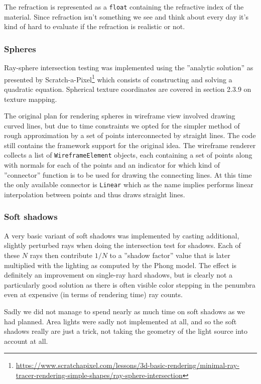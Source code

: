 \documentclass[a4paper,11pt]{article}
\begin{document}
The refraction is represented as a \texttt{float} containing the refractive index of the material.
Since refraction isn't something we see and think about every day it's kind of hard to evaluate if
the refraction is realistic or not.%

\subsubsection{Spheres}
Ray-sphere intersection testing was implemented using the ''analytic solution'' as presented
by Scratch-a-Pixel\footnote{\url{https://www.scratchapixel.com/lessons/3d-basic-rendering/minimal-ray-tracer-rendering-simple-shapes/ray-sphere-intersection}}
which consists of constructing and solving a quadratic equation. Spherical texture coordinates
are covered in section 2.3.9 on texture mapping.

The original plan for rendering spheres in wireframe view involved drawing curved lines, but
due to time constraints we opted for the simpler method of rough approximation by a set
of points interconnected by straight lines. The code still contains the framework support for
the original idea. The wireframe renderer collects a list of \texttt{WireframeElement} objects, each
containing a set of points along with normals for each of the points and an indicator for which kind of
''connector'' function is to be used for drawing the connecting lines. At this time the only
available connector is \texttt{Linear} which as the name implies performs linear interpolation
between points and thus draws straight lines.

\subsubsection{Soft shadows}
A very basic variant of soft shadows was implemented by casting additional, slightly perturbed
rays when doing the intersection test for shadows. Each of these $N$ rays then contribute
$1/N$ to a ''shadow factor'' value that is later multiplied with the lighting as computed by
the Phong model. The effect is definitely an improvement on single-ray hard shadows, but is
clearly not a particularly good solution as there is often visible color stepping in the
penumbra even at expensive (in terms of rendering time) ray counts.

Sadly we did not manage to spend nearly as much time on soft shadows as we had planned.
Area lights were sadly not implemented at all, and so the soft shadows really are just
a trick, not taking the geometry of the light source into account at all.
\end{document}
